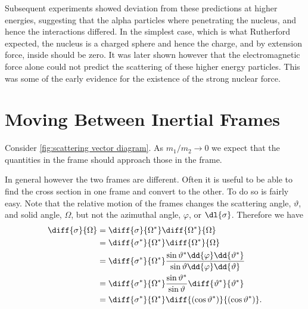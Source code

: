     Subsequent experiments showed deviation from these predictions at higher energies, suggesting that the alpha particles where penetrating the nucleus, and hence the interactions differed.
    In the simplest case, which is what Rutherford expected, the nucleus is a charged sphere and hence the charge, and by extension force, inside should be zero.
    It was later shown however that the electromagnetic force alone could not predict the scattering of these higher energy particles.
    This was some of the early evidence for the existence of the strong nuclear force.
    
    \section{Moving Between Inertial Frames}
    Consider \cref{fig:scattering vector diagram}.
    As \(m_1/m_2 \to 0\) we expect that the quantities in the \CM{} frame should approach those in the \LAB{} frame.
    
    In general however the two frames are different.
    Often it is useful to be able to find the cross section in one frame and convert to the other.
    To do so is fairly easy.
    Note that the relative motion of the frames changes the scattering angle, \(\vartheta\), and solid angle, \(\Omega\), but not the azimuthal angle, \(\varphi\), or \(\dl{\sigma}\).
    Therefore we have
    \begin{align}
        \diff{\sigma}{\Omega} &= \diff{\sigma}{\Omega^*}\diff{\Omega^*}{\Omega}\\
        &= \diff{\sigma^*}{\Omega^*}\diff{\Omega^*}{\Omega}\\
        &= \diff{\sigma^*}{\Omega^*} \frac{\sin\vartheta^* \dd{\varphi}\dd{\vartheta^*}}{\sin\vartheta \dd{\varphi} \dd{\vartheta}}\\
        &= \diff{\sigma^*}{\Omega^*} \frac{\sin\vartheta^*}{\sin\vartheta} \diff{\vartheta^*}{\vartheta^*}\\
        &= \diff{\sigma^*}{\Omega^*} \diff{(\cos\vartheta^*)}{(\cos\vartheta^*)}.
    \end{align}
    